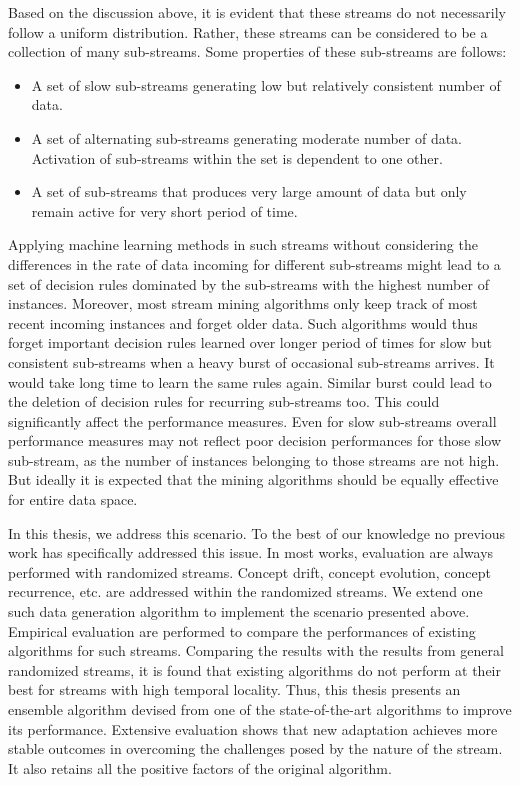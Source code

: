 Based on the discussion above, it is evident that these streams do not necessarily follow a uniform distribution. Rather, these streams can be considered to be a collection of many sub-streams. Some properties of these sub-streams are follows:
\begin{itemize}
    \item A set of slow sub-streams generating low but relatively consistent number of data.
    \item A set of alternating sub-streams generating moderate number of data. Activation of sub-streams within the set is dependent to one other.
    \item A set of sub-streams that produces very large amount of data but only remain active for very short period of time.
\end{itemize}

Applying machine learning methods in such streams without considering the differences in the rate of data incoming for different sub-streams might lead to a set of decision rules dominated by the sub-streams with the highest number of instances. Moreover, most stream mining algorithms only keep track of most recent incoming instances and forget older data. Such algorithms would thus forget important decision rules learned over longer period of times for slow but consistent sub-streams when a heavy burst of occasional sub-streams arrives. It would take long time to learn the same rules again. Similar burst could lead to the deletion of decision rules for recurring sub-streams too. This could significantly affect the performance measures. Even for slow sub-streams overall performance measures may not reflect poor decision performances for those slow sub-stream, as the number of instances belonging to those streams are not high. But ideally it is expected that the mining algorithms should be equally effective for entire data space.

In this thesis, we address this scenario. To the best of our knowledge no previous work has specifically addressed this issue. In most works, evaluation are always performed with randomized streams. Concept drift, concept evolution, concept recurrence, etc. are addressed within the randomized streams. We extend one such data generation algorithm to implement the scenario presented above. Empirical evaluation are performed to compare the performances of existing algorithms for such streams. Comparing the results with the results from general randomized streams, it is found that existing algorithms do not perform at their best for streams with high temporal locality. Thus, this thesis presents an ensemble algorithm devised from one of the state-of-the-art algorithms to improve its performance. Extensive evaluation shows that new adaptation achieves more stable outcomes in overcoming the challenges posed by the nature of the stream. It also retains all the positive factors of the original algorithm.

